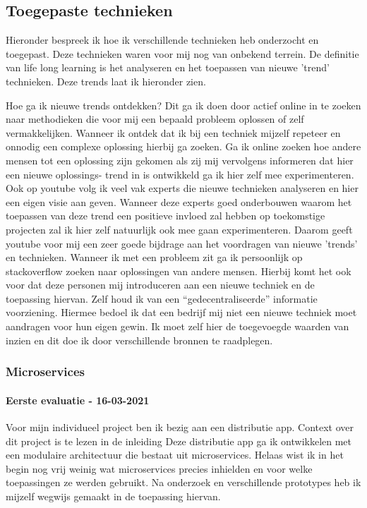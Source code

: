 \subsection{Toegepaste technieken}\label{subsec:toegepaste-technieken}
Hieronder bespreek ik hoe ik verschillende technieken heb onderzocht en toegepast.
Deze technieken waren voor mij nog van onbekend terrein.
De definitie van life long learning is het analyseren en het toepassen van nieuwe 'trend' technieken.
Deze trends laat ik hieronder zien.

Hoe ga ik nieuwe trends ontdekken?
Dit ga ik doen door actief online in te zoeken naar methodieken die voor mij een bepaald probleem oplossen of zelf
vermakkelijken.
Wanneer ik ontdek dat ik bij een techniek mijzelf repeteer en onnodig een complexe oplossing hierbij ga zoeken.
Ga ik online zoeken hoe andere mensen tot een oplossing zijn gekomen als zij mij vervolgens informeren dat hier een
nieuwe oplossings- trend in is ontwikkeld ga ik hier zelf mee experimenteren.
Ook op youtube volg ik veel vak experts die nieuwe technieken analyseren en hier een eigen visie aan geven.
Wanneer deze experts goed onderbouwen waarom het toepassen van deze trend een positieve invloed zal hebben op
toekomstige projecten zal ik hier zelf natuurlijk ook mee gaan experimenteren.
Daarom geeft youtube voor mij een zeer goede bijdrage aan het voordragen van nieuwe 'trends' en technieken.
Wanneer ik met een probleem zit ga ik persoonlijk op stackoverflow zoeken naar oplossingen van andere mensen.
Hierbij komt het ook voor dat deze personen mij introduceren aan een nieuwe techniek en de toepassing hiervan.
Zelf houd ik van een “gedecentraliseerde” informatie voorziening.
Hiermee bedoel ik dat een bedrijf mij niet een nieuwe techniek moet aandragen voor hun eigen gewin.
Ik moet zelf hier de toegevoegde waarden van inzien en dit doe ik door verschillende bronnen te raadplegen.


\subsubsection{Microservices}
\paragraph{Eerste evaluatie - 16-03-2021}
Voor mijn individueel project ben ik bezig aan een distributie app.
Context over dit project is te lezen in de inleiding
Deze distributie app ga ik ontwikkelen met een modulaire architectuur die bestaat uit microservices.
Helaas wist ik in het begin nog vrij weinig wat microservices precies inhielden en voor welke toepassingen ze werden gebruikt.
Na onderzoek en verschillende prototypes heb ik mijzelf wegwijs gemaakt in de toepassing hiervan.

